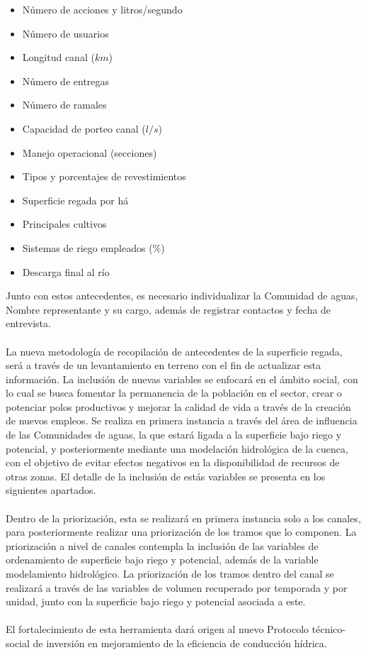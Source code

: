 \documentclass[]{article}
\begin{document}
\begin{itemize}
\item Número de acciones y litros/segundo
\item Número de usuarios
\item Longitud canal ($km$)
\item Número de entregas
\item Número de ramales
\item Capacidad de porteo canal ($l/s$)
\item Manejo operacional (secciones)
\item Tipos y porcentajes de revestimientos
\item Superficie regada por há
\item Principales cultivos
\item Sistemas de riego empleados ($\%$)
\item Descarga final al río
\end{itemize}

Junto con estos antecedentes, es necesario individualizar la Comunidad de aguas, Nombre representante y su cargo, además de registrar contactos y fecha de entrevista.\\
\\
La nueva metodología de recopilación de antecedentes de la superficie regada, será a través de un levantamiento en terreno con el fin de actualizar esta información. La inclusión de nuevas variables se enfocará en el ámbito social, con lo cual se busca fomentar la permanencia de la población en el sector, crear o potenciar polos productivos y mejorar la calidad de vida a través de la creación de nuevos empleos. Se realiza en primera instancia a través del área de influencia de las Comunidades de aguas, la que estará ligada a la superficie bajo riego y potencial, y posteriormente mediante una modelación hidrológica de la cuenca, con el objetivo de evitar efectos negativos en la disponibilidad de recursos de otras zonas. El detalle de la inclusión de estás variables se presenta en los siguientes apartados.\\
\\
Dentro de la priorización, esta se realizará en primera instancia solo a los canales, para posteriormente realizar una priorización de los tramos que lo componen. La priorización a nivel de canales contempla la inclusión de las variables de ordenamiento de superficie bajo riego y potencial, además de la variable modelamiento hidrológico. La priorización de los tramos dentro del canal se realizará a través de las variables de volumen recuperado por temporada y por unidad, junto con la superficie bajo riego y potencial asociada a este.\\
\\
El fortalecimiento de esta herramienta dará origen al nuevo Protocolo técnico-social de inversión en mejoramiento de la eficiencia de conducción hídrica.
\end{document}
